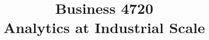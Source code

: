 \documentclass{article}
\title{Business 4720\\ \vspace{\baselineskip}
Analytics at Industrial Scale}
\begin{document}
\maketitle

\vfill

\clearpage


\end{document}
